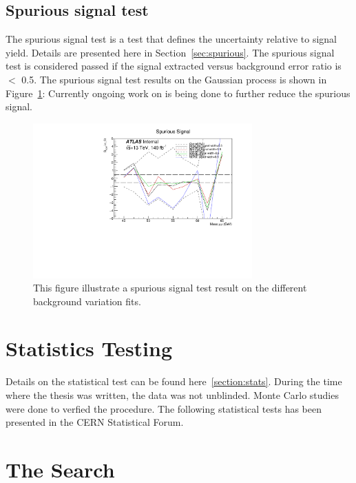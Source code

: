\subsection{Spurious signal test}

The spurious signal test is a test that defines the uncertainty relative to signal yield. Details are presented here in Section~\ref{sec:spurious}.
The spurious signal test is considered passed if the signal extracted versus background error ratio is $<$ 0.5.
The spurious signal test results on the Gaussian process is shown in Figure~\ref{fig:spurious}:
Currently ongoing work on is being done to further reduce the spurious signal.

\begin{figure}[!htb]
    \begin{center}
        \includegraphics[width=0.75\textwidth]{figures/chapter_dimuon/spurious}        
        \caption{
        This figure illustrate a spurious signal test result on the different background variation fits.}
        \label{fig:spurious}
    \end{center}
\end{figure}
\FloatBarrier

\section{Statistics Testing}
Details on the statistical test can be found here~\ref{section:stats}. During the time where the thesis was written, the data was not unblinded. Monte Carlo studies were done to verfied the procedure. The following statistical tests has been presented in the CERN Statistical Forum.

\section{The Search}

